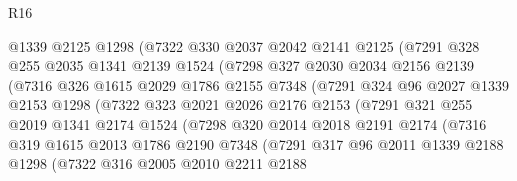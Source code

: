 \begin{lexlean}{R16}
\begin{coremodule}
                  @1339
                  @2125
                  @1298
                  (@7322
                    @330
                    @2037
                    @2042
                    @2141
                    @2125
                    (@7291
                      @328
                      @255
                      @2035
                      @1341
                      @2139
                      @1524
                      (@7298
                        @327
                        @2030
                        @2034
                        @2156
                        @2139
                        (@7316
                          @326
                          @1615
                          @2029
                          @1786
                          @2155
                          @7348
                          (@7291
                            @324
                            @96
                            @2027
                            @1339
                            @2153
                            @1298
                            (@7322
                              @323
                              @2021
                              @2026
                              @2176
                              @2153
                              (@7291
                                @321
                                @255
                                @2019
                                @1341
                                @2174
                                @1524
                                (@7298
                                  @320
                                  @2014
                                  @2018
                                  @2191
                                  @2174
                                  (@7316
                                    @319
                                    @1615
                                    @2013
                                    @1786
                                    @2190
                                    @7348
                                    (@7291
                                      @317
                                      @96
                                      @2011
                                      @1339
                                      @2188
                                      @1298
                                      (@7322
                                        @316
                                        @2005
                                        @2010
                                        @2211
                                        @2188

\end{coremodule}
\end{lexlean}
